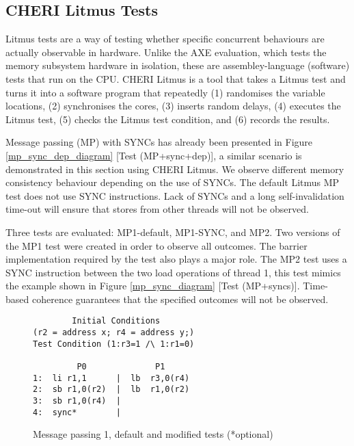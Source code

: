 \clearpage
	\subsection{CHERI Litmus Tests}
		\label{cheri_litmus_tests}
		Litmus tests are a way of testing whether specific concurrent behaviours are actually observable in hardware. Unlike the AXE evaluation, which tests the memory subsystem hardware in isolation, these are assembley-language (software) tests that run on the CPU. CHERI Litmus \cite{CHERI_litmus} is a tool that takes a Litmus test and turns it into a software program that repeatedly (1) randomises the variable locations, (2) synchronises the cores, (3) inserts random delays, (4) executes the Litmus test, (5) checks the Litmus test condition, and (6) records the results.
		
		Message passing (MP) with SYNCs has already been presented in Figure \ref{mp_sync_dep_diagram} [Test (MP+sync+dep)], a similar scenario is demonstrated in this section using CHERI Litmus. We observe different memory consistency behaviour depending on the use of SYNCs. The default Litmus MP test does not use SYNC instructions. Lack of SYNCs and a long self-invalidation time-out will ensure that stores from other threads will not be observed. 
		
		Three tests are evaluated: MP1-default, MP1-SYNC, and MP2. Two versions of the MP1 test were created in order to observe all outcomes. The barrier implementation required by the test also plays a major role. The MP2 test uses a SYNC instruction between the two load operations of thread 1, this test mimics the example shown in Figure \ref{mp_sync_diagram} [Test (MP+syncs)]. Time-based coherence guarantees that the specified outcomes will not be observed.

\begin{figure}[t]
\begin{tcolorbox}[
colback=blue!1!white,
colframe=blue!65!black]
\begin{center}
\begin{BVerbatim}
        Initial Conditions       
(r2 = address x; r4 = address y;)
Test Condition (1:r3=1 /\ 1:r1=0)

         P0              P1 
1:  li r1,1      |  lb  r3,0(r4) 
2:  sb r1,0(r2)  |  lb  r1,0(r2) 
3:  sb r1,0(r4)  |
4:  sync*        |
\end{BVerbatim} 
\end{center}
\end{tcolorbox}
\caption[Message passing 1, default and modified tests]{Message passing 1, default and modified tests (*optional)}
\label{mp_1_litmus}
\end{figure}

